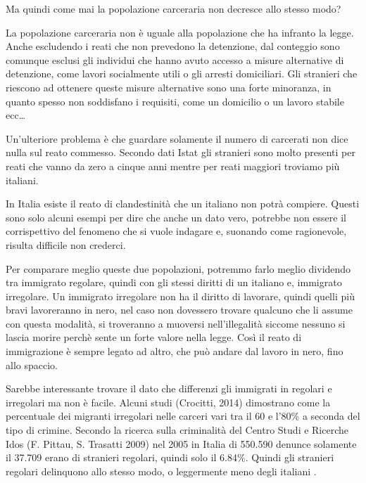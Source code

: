\documentclass[12pt]{book} %
\begin{document}
\bigskip

Ma quindi come mai la popolazione carceraria non decresce allo stesso modo?

La popolazione carceraria non è uguale alla popolazione che ha infranto la legge. Anche escludendo i reati che non
prevedono la detenzione, dal conteggio sono comunque esclusi gli individui che hanno avuto accesso a misure alternative di
detenzione, come lavori socialmente utili o gli arresti domiciliari. Gli stranieri che riescono ad ottenere queste
misure alternative sono una forte minoranza, in quanto spesso non soddisfano i requisiti, come un domicilio o un lavoro stabile ecc…

Un'ulteriore problema è che guardare solamente il numero di carcerati non dice nulla sul reato commesso. Secondo dati Istat gli stranieri sono molto presenti per reati che vanno da zero a cinque anni mentre per reati maggiori troviamo più italiani.

\bigskip

In Italia esiste il reato di clandestinità che un italiano non potrà compiere. 
Questi sono solo alcuni esempi per dire che anche un dato vero, potrebbe non essere il corrispettivo del fenomeno che si vuole indagare e, suonando come ragionevole, risulta difficile non crederci.

Per comparare meglio queste due popolazioni, potremmo farlo meglio dividendo tra immigrato regolare, quindi con gli stessi diritti di un italiano e, immigrato irregolare. Un immigrato irregolare non ha il diritto di lavorare, quindi quelli più
bravi lavoreranno in nero, nel caso non dovessero trovare qualcuno che li assume con questa modalità, si troveranno a muoversi nell'illegalità siccome nessuno si lascia morire perchè sente un forte valore nella legge. Così il reato di immigrazione è sempre legato ad altro, che può andare dal lavoro in nero, fino allo spaccio. 

Sarebbe interessante trovare il dato che differenzi gli immigrati in regolari e irregolari ma non è facile. Alcuni studi
(Crocitti,
2014) dimostrano come la percentuale dei migranti irregolari nelle carceri vari tra il 60 e l'80\% a
seconda del tipo di crimine. Secondo la ricerca sulla criminalità del Centro Studi e Ricerche Idos (F. Pittau, S.
Trasatti 2009) nel 2005 in Italia di 550.590 denunce solamente il 37.709 erano di stranieri regolari, quindi solo il
6.84\%. Quindi gli stranieri regolari delinquono allo stesso modo, o leggermente meno degli italiani  .
\end{document}

